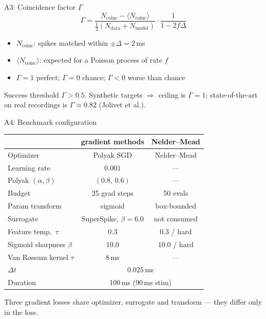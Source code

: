 \documentclass[17pt, t, lualatex]{beamer}
\begin{document}
\begin{frame}{A3: Coincidence factor $\Gamma$}
\[
\Gamma = \frac{N_{\text{coinc}} - \langle N_{\text{coinc}}\rangle}{\tfrac{1}{2}(N_{\text{data}}+N_{\text{model}})}\cdot\frac{1}{1-2f\Delta}
\]
\begin{itemize}
  \item $N_{\text{coinc}}$: spikes matched within $\pm\Delta = 2$\,ms
  \item $\langle N_{\text{coinc}}\rangle$: expected for a Poisson process of rate $f$
  \item $\Gamma = 1$ perfect; $\Gamma = 0$ chance; $\Gamma < 0$ worse than chance
\end{itemize}
\vspace{0.2cm}
\small Success threshold $\Gamma > 0.5$. Synthetic targets $\Rightarrow$ ceiling is $\Gamma=1$; state-of-the-art on real recordings is $\Gamma\approx 0.82$ (Jolivet et al.).
\end{frame}

\begin{frame}{A4: Benchmark configuration}
\centering\footnotesize
\begin{tabular}{lcc}
\toprule
 & \textbf{gradient methods} & \textbf{Nelder--Mead} \\
\midrule
Optimizer          & Polyak SGD & Nelder--Mead \\
Learning rate      & $0.001$ & --- \\
Polyak $(\alpha,\beta)$ & $(0.8,\,0.6)$ & --- \\
Budget             & 25 grad steps & 50 evals \\
Param transform    & sigmoid & box-bounded \\
Surrogate          & SuperSpike, $\beta=6.0$ & not consumed \\
\midrule
Feature temp.\ $\tau$ & $0.3$ & $0.3$ / hard \\
Sigmoid sharpness $\beta$ & $10.0$ & $10.0$ / hard \\
Van Rossum kernel $\tau$ & $8$\,ms & --- \\
\midrule
$\Delta t$         & \multicolumn{2}{c}{$0.025$\,ms} \\
Duration           & \multicolumn{2}{c}{100\,ms (90\,ms stim)} \\
\bottomrule
\end{tabular}
\vspace{0.25cm}

\footnotesize Three gradient losses share optimizer, surrogate and transform --- they differ only in the loss.
\end{frame}
\end{document}
